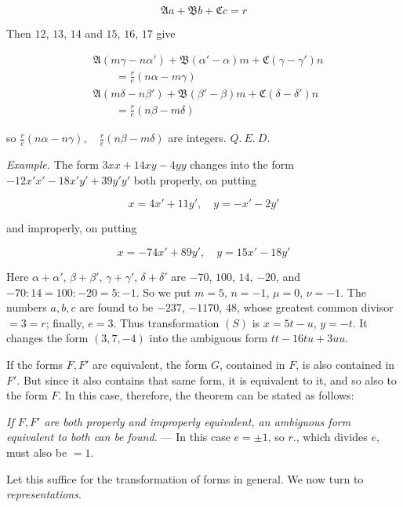 \[
\mathfrak{A}a+\mathfrak{B}b+\mathfrak{C}c=r
\]

Then $12$, $13$, $14$ and $15$, $16$, $17$ give

\[
\begin{aligned}&\mathfrak A(m\gamma-n\alpha')+\mathfrak B(\alpha'-\alpha)m+\mathfrak C(\gamma-\gamma')n\\&\qquad=\frac re(n\alpha-m\gamma)\\&\mathfrak A(m\delta-n\beta')+\mathfrak B(\beta'-\beta)m+\mathfrak C(\delta-\delta')n\\&\qquad=\frac re(n\beta-m\delta)\end{aligned}
\]

so $\frac{r}{e}(n\alpha-n\gamma),\quad\frac{r}{e}(n\beta-m\delta)$ are integers. $Q.\ E.\ D.$



\emph{Example.} The form $3xx+14xy-4yy$ changes into the form $-12x'x'-18x'y'+39y'y'$ both properly, on putting

\[
x=4x'+11y',\quad y=-x'-2y'
\]

and improperly, on putting

\[
x=-74x'+89y',\quad y=15x'-18y'
\]

Here $\alpha+\alpha'$, $\beta+\beta'$, $\gamma+\gamma'$, $\delta+\delta'$ are $-70$, $100$, $14$, $-20$, and $-70:14=100:-20=5:-1$. So we put $m=5$, $n=-1$, $\mu=0$, $\nu=-1$. The numbers $a,b,c$ are found to be $-237$, $-1170$, $48$, whose greatest common divisor $=3=r$; finally, $e=3$. Thus transformation $(S)$ is $x=5t-u$, $y=-t$. It changes the form $(3,7,-4)$ into the ambiguous form $tt-16tu+3uu$.

If the forms $F,F'$ are equivalent, the form $G$, contained in $F$, is also contained in $F'$. But since it also contains that same form, it is equivalent to it, and so also to the form $F$. In this case, therefore, the theorem can be stated as follows:

\emph{If $F,F'$ are both properly and improperly equivalent, an ambiguous form equivalent to both can be found.} --- In this case $e=\pm1$, so $r.$, which divides $e$, must also be $=1$.

Let this suffice for the transformation of forms in general. We now turn to \emph{representations}.
